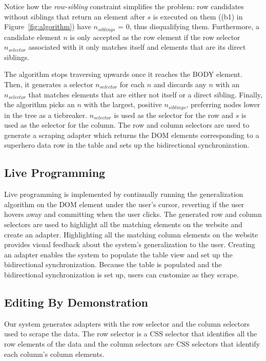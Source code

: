 \documentclass[sigconf,10pt]{acmart}
\begin{document}
Notice how the \emph{row-sibling} constraint simplifies the problem: row
candidates without siblings that return an element after \(s\) is
executed on them ((b1) in Figure~\ref{fig:algorithm}) have
\(n_{siblings}\) = 0, thus disqualifying them. Furthermore, a candidate
element \(n\) is only accepted as the row element if the row selector
\(n_{selector}\) associated with it only matches itself and elements
that are its direct siblings.

The algorithm stops traversing upwards once it reaches the BODY element.
Then, it generates a selector \(n_{selector}\) for each \(n\) and
discards any \(n\) with an \(n_{selector}\) that matches elements that
are either not itself or a direct sibling. Finally, the algorithm picks
an \(n\) with the largest, positive \(n_{siblings}\), preferring nodes
lower in the tree as a tiebreaker. \(n_{selector}\) is used as the
selector for the row and \(s\) is used as the selector for the column.
The row and column selectors are used to generate a scraping adapter
which returns the DOM elements corresponding to a superhero data row in
the table and sets up the bidirectional synchronization.

\hypertarget{live-programming}{%
\subsection{Live Programming}\label{live-programming}}

Live programming is implemented by continually running the
generalization algorithm on the DOM element under the user's cursor,
reverting if the user hovers away and committing when the user clicks.
The generated row and column selectors are used to highlight all the
matching elements on the website and create an adapter. Highlighting all
the matching column elements on the website provides visual feedback
about the system's generalization to the user. Creating an adapter
enables the system to populate the table view and set up the
bidirectional synchronization. Because the table is populated and the
bidirectional synchronization is set up, users can customize as they
scrape.

\hypertarget{editing-by-demonstration}{%
\subsection{Editing By Demonstration}\label{editing-by-demonstration}}

Our system generates adapters with the row selector and the column
selectors used to scrape the data. The row selector is a CSS selector
that identifies all the row elements of the data and the column
selectors are CSS selectors that identify each column's column elements.
\end{document}
